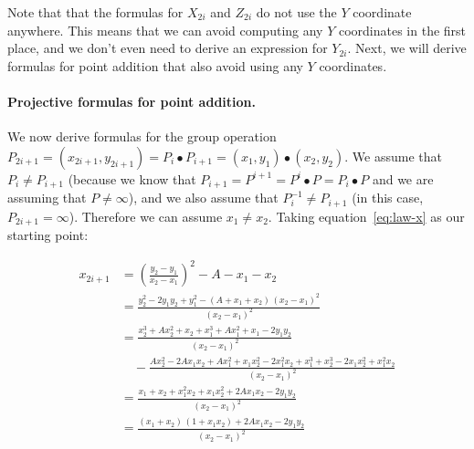 \documentclass[manuscript]{acmart}
\begin{document}
Note that that the formulas for $X_{2i}$ and $Z_{2i}$ do not use the $Y$ coordinate anywhere.
This means that we can avoid computing any $Y$ coordinates in the first place, and we don't even need to derive an expression for $Y_{2i}$.
Next, we will derive formulas for point addition that also avoid using any $Y$ coordinates.

\paragraph{Projective formulas for point addition.}

We now derive formulas for the group operation
$P_{2i+1} = (x_{2i+1}, y_{2i+1}) = P_i \bullet P_{i+1} = (x_1, y_1) \bullet (x_2, y_2)$.
We assume that $P_i \ne P_{i+1}$ (because we know that $P_{i+1} = P^{i+1} = P^i \bullet P = P_i \bullet P$ and we are assuming that $P \ne \infty$), and we also assume that $P_i^{-1} \ne P_{i+1}$ (in this case, $P_{2i+1} = \infty$).
Therefore we can assume $x_1 \neq x_2$.
Taking equation~\eqref{eq:law-x} as our starting point:

\begin{align}
x_{2i+1} &= \left(\frac{y_2 - y_1}{x_2 - x_1}\right)^2 - A - x_1 - x_2 \nonumber\\[5pt]
&= \frac{y_2^2 - 2y_1 y_2 + y_1^2 - (A + x_1 + x_2)\,(x_2 - x_1)^2}{(x_2 - x_1)^2} \nonumber\\[5pt]
&= \frac{x_2^3 + Ax_2^2 + x_2 + x_1^3 + Ax_1^2 + x_1 - 2y_1 y_2}{(x_2 - x_1)^2} \nonumber\\
    &\quad - \frac{Ax_2^2 - 2Ax_1 x_2 + Ax_1^2 + x_1 x_2^2 - 2 x_1^2 x_2 + x_1^3 + x_2^3 - 2x_1 x_2^2 + x_1^2 x_2}{(x_2 - x_1)^2} \nonumber\\[5pt]
&= \frac{x_1 + x_2 + x_1^2 x_2 + x_1 x_2^2 + 2A x_1 x_2 - 2y_1 y_2}{(x_2 - x_1)^2} \nonumber\\[5pt]
&= \frac{(x_1 + x_2)\,(1 + x_1 x_2) + 2A x_1 x_2 - 2y_1 y_2}{(x_2 - x_1)^2} \label{eq:add-x}
\end{align}
\end{document}

